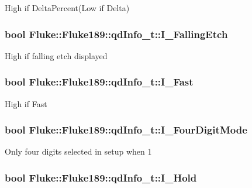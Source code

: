 \label{structFluke_1_1Fluke189_1_1qdInfo__t_a44210af5a4c0b632b88b551e6a92846d}
High if DeltaPercent(Low if Delta) \hypertarget{structFluke_1_1Fluke189_1_1qdInfo__t_a9d83990a6827723f7a5af68630f71d6a}{
\subsubsection[{I\_\-FallingEtch}]{\setlength{\rightskip}{0pt plus 5cm}bool {\bf Fluke::Fluke189::qdInfo\_\-t::I\_\-FallingEtch}}}
\label{structFluke_1_1Fluke189_1_1qdInfo__t_a9d83990a6827723f7a5af68630f71d6a}
High if falling etch displayed \hypertarget{structFluke_1_1Fluke189_1_1qdInfo__t_a6be3b9b1cf4f648315f5904487fe3e48}{
\subsubsection[{I\_\-Fast}]{\setlength{\rightskip}{0pt plus 5cm}bool {\bf Fluke::Fluke189::qdInfo\_\-t::I\_\-Fast}}}
\label{structFluke_1_1Fluke189_1_1qdInfo__t_a6be3b9b1cf4f648315f5904487fe3e48}
High if Fast \hypertarget{structFluke_1_1Fluke189_1_1qdInfo__t_ac27c02c4519f23bbe71f6c0f27253dec}{
\subsubsection[{I\_\-FourDigitMode}]{\setlength{\rightskip}{0pt plus 5cm}bool {\bf Fluke::Fluke189::qdInfo\_\-t::I\_\-FourDigitMode}}}
\label{structFluke_1_1Fluke189_1_1qdInfo__t_ac27c02c4519f23bbe71f6c0f27253dec}
Only four digits selected in setup when 1 \hypertarget{structFluke_1_1Fluke189_1_1qdInfo__t_af6144c8481ee484c798ea68a5c290689}{
\subsubsection[{I\_\-Hold}]{\setlength{\rightskip}{0pt plus 5cm}bool {\bf Fluke::Fluke189::qdInfo\_\-t::I\_\-Hold}}}
